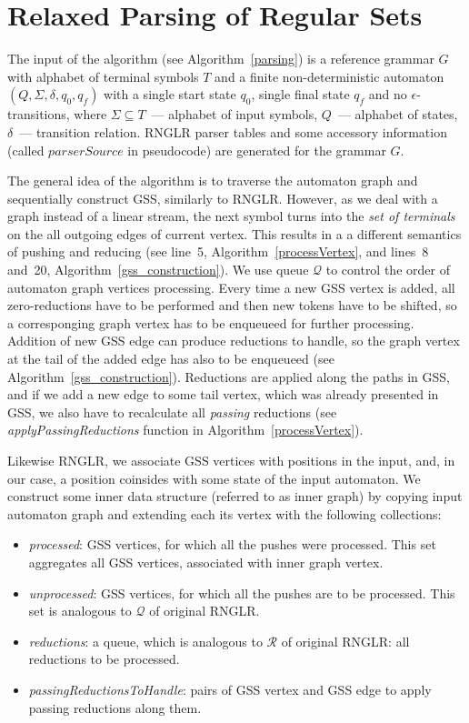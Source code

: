 \section{Relaxed Parsing of Regular Sets}

The input of the algorithm (see Algorithm~\ref{parsing}) is a reference grammar $G$ with alphabet of terminal symbols $T$ 
and a finite non-deterministic automaton $(Q, \Sigma, \delta, q_0, q_f)$ with a single start state $q_0$, single final state $q_f$ 
and no $\epsilon$-transitions, where $\Sigma \subseteq T$~--- alphabet of input symbols, $Q$~--- alphabet of states, 
$\delta$~--- transition relation. RNGLR parser tables and some accessory information (called $parserSource$ in pseudocode) 
are generated for the grammar $G$. 

The general idea of the algorithm is to traverse the automaton graph and sequentially construct GSS, similarly to RNGLR.
However, as we deal with a graph instead of a linear stream, the next symbol turns into the \emph{set of terminals} on the 
all outgoing edges of current vertex. This results in a a different semantics of pushing and reducing (see line~5, 
Algorithm~\ref{processVertex}, and lines~8 and~20, Algorithm~\ref{gss_construction}). We use queue $\mathcal Q$ to control the 
order of automaton graph vertices processing. Every time a new GSS vertex is added, all zero-reductions have to be performed 
and then new tokens have to be shifted, so a corresponging graph vertex has to be enqueueed for further processing. 
Addition of new GSS edge can produce reductions to handle, so the graph vertex at the tail of the added edge has 
also to be enqueueed (see Algorithm~\ref{gss_construction}). Reductions are applied along the paths in GSS, and if we add
a new edge to some tail vertex, which was already presented in GSS, we also have to recalculate all \emph{passing} reductions
(see \emph{applyPassingReductions} function in Algorithm~\ref{processVertex}).

Likewise RNGLR, we associate GSS vertices with positions in the input,
and, in our case, a position coinsides with some state of the input automaton. We construct some
inner data structure (referred to as inner graph) by copying input automaton graph and 
extending each its vertex with the following collections: 

\begin{itemize}
  \item \emph{processed}: GSS vertices, for which all the pushes were processed. 
   This set aggregates all GSS vertices, associated with inner graph vertex.
  \item \emph{unprocessed}: GSS vertices, for which all the pushes are to be processed. 
   This set is analogous to $\mathcal{Q}$ of original RNGLR.
  \item \emph{reductions}: a queue, which is analogous to $\mathcal{R}$ of original RNGLR: 
   all reductions to be processed.
  \item \emph{passingReductionsToHandle}: pairs of GSS vertex and GSS edge to apply 
   passing reductions along them.
\end{itemize}

